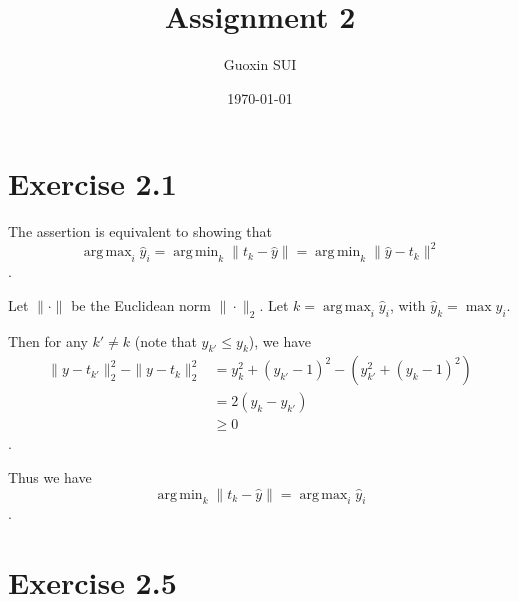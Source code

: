\documentclass{article}
\title{Assignment 2}
\author{Guoxin SUI}
\date{\today}
\DeclareMathOperator*{\argmax}{arg\,max}
\DeclareMathOperator*{\argmin}{arg\,min}
\begin{document}
\maketitle

\section{Exercise 2.1}

The assertion is equivalent to showing that \[
\argmax_i \hat y_i = \argmin_k \| t_k - \hat y \| = \argmin_k \|\hat y - t_k \|^2
\] .

Let $\| \cdot \|$ be the Euclidean norm $\| \cdot \|_2$.  Let $k = \argmax_i \hat y_i$, with $\hat y_k = \max y_i$.

Then for any $k' \neq k$ (note that $y_{k'} \leq y_k$), we have \begin{align*}
\| y - t_{k'} \|_2^2 - \| y - t_k \|_2^2 &= y_k^2 + \left(y_{k'} - 1 \right)^2 - \left( y_{k'}^2 + \left(y_k - 1 \right)^2 \right) \\
&= 2 \left(y_k - y_{k'}\right) \\
&\geq 0
\end{align*} .

Thus we have \[
\argmin_k \| t_k - \hat y \| = \argmax_i \hat y_i
\].

\section{Exercise 2.5}
\end{document}
